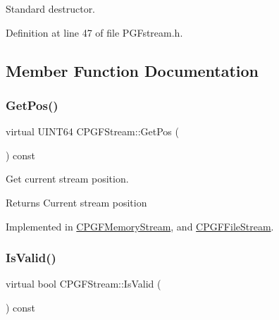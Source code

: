 Standard destructor. 



Definition at line 47 of file P\+G\+Fstream.\+h.


\begin{DoxyCode}{0}

\end{DoxyCode}


\subsection{Member Function Documentation}
\mbox{\label{classCPGFStream_a841e109647ea77dd9e589ab00ef4aad8}} 
\subsubsection{\texorpdfstring{GetPos()}{GetPos()}}
{\footnotesize\ttfamily virtual U\+I\+N\+T64 C\+P\+G\+F\+Stream\+::\+Get\+Pos (\begin{DoxyParamCaption}{ }\end{DoxyParamCaption}) const\hspace{0.3cm}{\ttfamily [pure virtual]}}

Get current stream position. \begin{DoxyReturn}{Returns}
Current stream position 
\end{DoxyReturn}


Implemented in \mbox{\hyperlink{classCPGFMemoryStream_a40556ef625e2bd49144281b3f6e1f0dd}{C\+P\+G\+F\+Memory\+Stream}}, and \mbox{\hyperlink{classCPGFFileStream_a9ec4715342add84461c62631101e1ce6}{C\+P\+G\+F\+File\+Stream}}.

\mbox{\label{classCPGFStream_abf99169c9bcf0feb57edc55cec215b95}} 
\subsubsection{\texorpdfstring{IsValid()}{IsValid()}}
{\footnotesize\ttfamily virtual bool C\+P\+G\+F\+Stream\+::\+Is\+Valid (\begin{DoxyParamCaption}{ }\end{DoxyParamCaption}) const\hspace{0.3cm}{\ttfamily [pure virtual]}}

